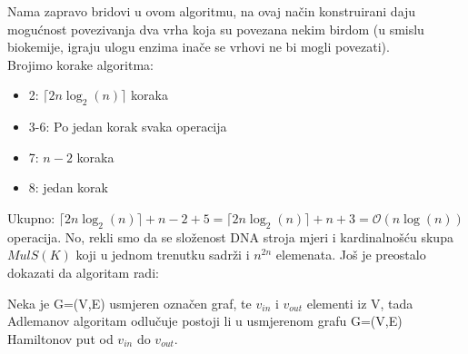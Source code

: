 \documentclass[a4paper,oneside,12pt]{memoir} %
\begin{document}
\begin{spacing}{1.5}
Nama zapravo bridovi u ovom algoritmu, na ovaj način konstruirani daju mogućnost povezivanja dva vrha koja su povezana nekim birdom (u smislu biokemije, igraju ulogu enzima inače se vrhovi ne bi mogli povezati). \\
Brojimo korake algoritma:
\begin{itemize}
\item 2: $\lceil 2n \log _2 (n) \rceil$ koraka
\item  3-6: Po jedan korak svaka operacija
\item 7: $n-2$ koraka
\item 8: jedan korak
\end{itemize}
Ukupno: $\lceil 2n \log _2 (n) \rceil + n-2 + 5=\lceil 2n \log _2 (n) \rceil + n+3 = \mathcal{O}(n \log(n))$ operacija. No, rekli smo da se složenost DNA stroja mjeri i kardinalnošću skupa $MulS(K)$ koji u jednom trenutku sadrži i $n^{2n}$ elemenata. 
Još je preostalo dokazati da algoritam radi:
\begin{thm} Neka je G=(V,E) usmjeren označen graf, te $v_{in}$ i $v_{out}$ elementi iz V, tada Adlemanov algoritam odlučuje postoji li u usmjerenom grafu G=(V,E) Hamiltonov put od $v_{in}$ do $v_{out}$. \end{thm}


\end{spacing}
\end{document}
